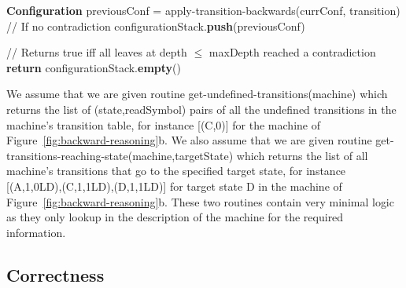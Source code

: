 \begin{algorithm}
\begin{algorithmic}[1]
          \State \textbf{Configuration} previousConf = {\sc apply-transition-backwards}(currConf, transition)
          \State // If no contradiction
          \State configurationStack.\textbf{push}(previousConf)
          \EndIf
          \EndFor
          \EndWhile

          \State // Returns true iff all leaves at depth $\leq$ maxDepth reached a contradiction
          \State \textbf{return} configurationStack.\textbf{empty}()
          \EndProcedure

  \end{algorithmic}
\end{algorithm}

We assume that we are given routine {\sc get-undefined-transitions}(machine) which returns the list of (state,readSymbol) pairs of all the undefined transitions in the machine's transition table, for instance [(\textcolor{colorC}{C},0)] for the machine of Figure~\ref{fig:backward-reasoning}b. We also assume that we are given routine {\sc get-transitions-reaching-state}(machine,targetState) which returns the list of all machine's transitions that go to the specified target state, for instance [(\textcolor{colorA}{A},1,0LD),(\textcolor{colorC}{C},1,1LD),(D,1,1LD)] for target state D in the machine of Figure~\ref{fig:backward-reasoning}b. These two routines contain very minimal logic as they only lookup in the description of the machine for the required information.
\subsection{Correctness}